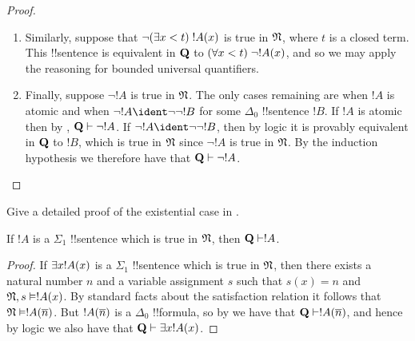 \documentclass[../../../include/open-logic-section]{subfiles}
\begin{document}
\begin{proof}
\begin{enumerate}
%
\item Similarly, suppose that $\lnot (\exists x<t)\; !A(x)$ is
true in $\Struct{N}$, where $t$ is a closed term. This
!!{sentence} is equivalent in $\mathbf{Q}$ to
$(\forall x<t)\; \lnot!A(x)$, and so we may apply the reasoning
for bounded universal quantifiers.
%
\item Finally, suppose $\lnot !A$ is true in $\Struct{N}$.
The only cases remaining are when $!A$ is atomic and when
$\lnot !A \ident \lnot\lnot !B$ for some $\Delta_0$
!!{sentence} $!B$. If $!A$ is atomic then by
, $\Th{Q} \Proves \lnot !A$.
If $\lnot !A \ident \lnot\lnot !B$, then by logic it is
provably equivalent in $\mathbf{Q}$ to $!B$, which is true in
$\Struct{N}$ since $\lnot !A$ is true in $\Struct{N}$.
By the induction hypothesis we therefore have that
$\Th{Q} \Proves \lnot !A$.
\end{enumerate}
\end{proof}

\begin{prob}
Give a detailed proof of the existential case in
.
\end{prob}

\begin{thm}
If $!A$ is a $\Sigma_1$ !!{sentence} which is true in
$\Struct{N}$, then $\Th{Q} \Proves !A$.
\end{thm}

\begin{proof}
If $\lexists{x}!A(x)$ is a $\Sigma_1$ !!{sentence} which
is true in $\Struct{N}$, then there exists a natural number
$n$ and a variable assignment $s$ such that $s(x) = n$ and
$\Struct{N},s \Entails !A(x)$. By standard facts about
the satisfaction relation it follows that
$\Struct{N} \Entails !A(\num n)$. But $!A(\overline{n})$ is a
$\Delta_0$ !!{formula}, so by 
we have that $\Th{Q} \Proves !A(\num n)$, and hence by
logic we also have that $\Th{Q} \Proves \exists{x}!A(x)$.
\end{proof}
\end{document}
